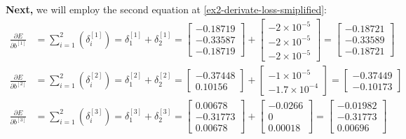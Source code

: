 \documentclass[12pt]{article}
\begin{document}
\begin{enumerate}[leftmargin=\labelsep]
        \textbf{Next,} we will employ the second equation at \eqref{ex2-derivate-loss-smiplified}:
        \begingroup
        \allowdisplaybreaks
          \begin{align*}
            \frac{\partial E}{\partial b^{[1]}} &= \sum_{i=1}^{2} \left(\delta^{[1]}_i\right)
             = \delta^{[1]}_1 + \delta^{[1]}_2
             = \begin{bmatrix} -0.18719 \\ -0.33587 \\ -0.18719 \end{bmatrix} +
                 \begin{bmatrix} -2 \times 10^{-5} \\ -2 \times 10^{-5} \\ -2 \times 10^{-5} \end{bmatrix}
             = \begin{bmatrix} -0.18721 \\ -0.33589 \\ -0.18721 \end{bmatrix} \\
            \frac{\partial E}{\partial b^{[2]}} &= \sum_{i=1}^{2} \left(\delta^{[2]}_i\right)
             = \delta^{[2]}_1 + \delta^{[2]}_2
             = \begin{bmatrix} -0.37448 \\ 0.10156 \end{bmatrix} +
                 \begin{bmatrix} -1 \times 10^{-5} \\ -1.7 \times 10^{-4}  \end{bmatrix}
             = \begin{bmatrix} -0.37449 \\ -0.10173 \end{bmatrix} \\
            \frac{\partial E}{\partial b^{[3]}} &= \sum_{i=1}^{2} \left(\delta^{[3]}_i\right)
             = \delta^{[3]}_1 + \delta^{[3]}_2
             = \begin{bmatrix} 0.00678 \\ -0.31773 \\ 0.00678 \end{bmatrix} +
                 \begin{bmatrix} -0.0266 \\ 0 \\ 0.00018 \end{bmatrix}
             = \begin{bmatrix} -0.01982 \\ -0.31773 \\ 0.00696 \end{bmatrix}
          \end{align*}
        \endgroup


\end{enumerate}
\end{document}
